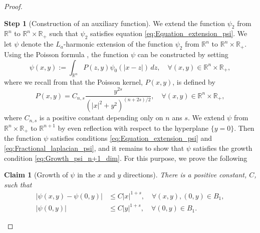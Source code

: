\documentclass[11pt,reqno]{amsart}
\newtheorem{claim}[thm]{Claim}
\theoremstyle{definition}
\newtheorem{step}{Step}
\theoremstyle{remark}
\begin{document}
\begin{proof}
\begin{step}[Construction of an auxiliary function]
 We extend the function $\psi_2$ from ${\mathbb{R}}^n$ to ${\mathbb{R}}^n\times{\mathbb{R}}_+$ such that $\psi_2$ satisfies equation \eqref{eq:Equation_extension_psi}. We let $\psi$ denote the $L_a$-harmonic extension of the function $\psi_2$ from ${\mathbb{R}}^n$ to ${\mathbb{R}}^n\times{\mathbb{R}}_+$. Using the Poisson formula \cite[\S 2.4]{Caffarelli_Silvestre_2007}, the function $\psi$ can be constructed by setting
\begin{equation}
\label{eq:Definition_psi}
\psi(x,y):=\int_{{\mathbb{R}}^n} P(z,y) \psi_0(|x-z|) \, dz,\quad\forall (x,y)\in{\mathbb{R}}^{n}\times{\mathbb{R}}_+,
\end{equation}
where we recall from \cite[Formula (2.3)]{Caffarelli_Silvestre_2007} that the Poisson kernel, $P(x,y)$, is defined by 
\begin{equation}
\label{eq:Poisson_kernel}
P(x,y)= C_{n,s} \frac{y^{2s}}{\left(|x|^2+y^2\right)^{(n+2s)/2}},\quad\forall (x,y)\in {\mathbb{R}}^n\times{\mathbb{R}}_+,
\end{equation}
where $C_{n,s}$ is a positive constant depending only on $n$ ans $s$. We extend $\psi$ from ${\mathbb{R}}^n\times{\mathbb{R}}_+$ to ${\mathbb{R}}^{n+1}$ by even reflection with respect to the hyperplane $\{y=0\}$. Then the function $\psi$ satisfies conditions \eqref{eq:Equation_extension_psi} and \eqref{eq:Fractional_laplacian_psi}, and it remains to show that $\psi$ satisfies the growth condition \eqref{eq:Growth_psi_n+1_dim}. For this purpose, we prove the following
\begin{claim}[Growth of $\psi$ in the $x$ and $y$ directions]
\label{claim:Growth_psi}
There is a positive constant, $C$, such that
\begin{align}
\label{eq:Growth_x_direction}
|\psi(x,y)-\psi(0,y)| &\leq C|x|^{1+s},\quad\forall (x,y), (0,y) \in B_1,\\
\label{eq:Growth_y_direction}
|\psi(0,y)| &\leq C|y|^{1+s},\quad\forall (0,y)\in B_1.
\end{align}
\end{claim}


\end{step}
\end{proof}
\end{document}
